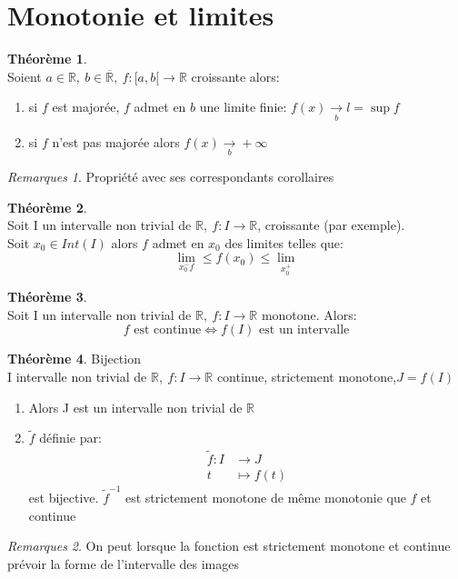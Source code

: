 \documentclass[fleqn]{article}
\theoremstyle{definition} \newtheorem*{defi}{D\'efinition}
\theoremstyle{definition} \newtheorem*{theo}{Th\'eor\`eme}
\theoremstyle{definition} \newtheorem*{prop}{Propri\'et\'e}
\theoremstyle{remark} \newtheorem*{rqs}{Remarques}
\begin{document}
\section{Monotonie et limites}
\begin{theo} $ $ \\
	Soient $a \in \mathbb{R},\ b \in \overline{\mathbb{R}},\ f:[a,b[ \rightarrow \mathbb{R}$ croissante alors:
	\begin{enumerate}
		\item si $f$ est major\'ee, $f$ admet en $b$ une limite finie: $f(x) \underset{b}{\rightarrow} l = \sup f$
		\item si $f$ n'est pas major\'ee alors $f(x) \underset{b}{\rightarrow} +\infty$
	\end{enumerate}
	\begin{rqs}
		Propri\'et\'e avec ses correspondants corollaires
	\end{rqs}
\end{theo}

\begin{theo} $ $ \\
	Soit I un intervalle non trivial de $\mathbb{R},\ f:I \rightarrow \mathbb{R}$, croissante (par exemple). \\
	Soit $x_0 \in Int(I)$ alors $f$ admet en $x_0$ des limites telles que:
	\[\lim_{x_0^- f} \leq f(x_0) \leq \lim_{x_0^+}\]
\end{theo}

\begin{theo} $ $ \\
	Soit I un intervalle non trivial de $\mathbb{R},\ f:I\rightarrow \mathbb{R}$ monotone. Alors:
	\[f \text{ est continue} \Leftrightarrow f(I) \text{ est un intervalle}\]
\end{theo}

\begin{theo} Bijection \\
	I intervalle non trivial de $\mathbb{R},\ f:I\rightarrow \mathbb{R}$ continue, strictement monotone,$J = f(I)$
	\begin{enumerate}
		\item Alors J est un intervalle non trivial de $\mathbb{R}$
		\item $\tilde{f}$ d\'efinie par:
			\begin{align*}
				\tilde{f}: I &\rightarrow J \\
				t &\mapsto f(t)
			\end{align*}
			est bijective. $\tilde{f}^{-1}$ est strictement monotone de m\^eme monotonie que $f$ et continue
	\end{enumerate}
	\begin{rqs}
		On peut lorsque la fonction est strictement monotone et continue pr\'evoir la forme de l'intervalle des images
	\end{rqs}
\end{theo}
\end{document}
